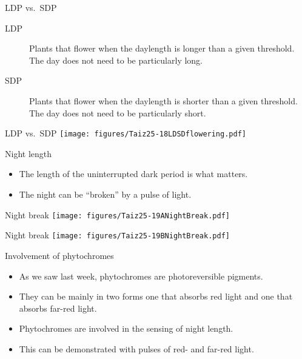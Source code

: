 \documentclass[10pt]{beamer}
\begin{document}
\begin{frame}{LDP vs.\ SDP}
    \begin{description}
        \item[LDP] Plants that flower when the daylength is longer than a given threshold. The day does not need to be particularly long.
        \item[SDP] Plants that flower when the daylength is shorter than a given threshold. The day does not need to be particularly short.
    \end{description}
\end{frame}

\begin{frame}{LDP vs.\ SDP}
    \centering
    \texttt{[image: figures/Taiz25-18LDSDflowering.pdf]}\\
    {\small \autocite[from][]{TaiZei2006}}
\end{frame}

\begin{frame}{Night length}
    \begin{itemize}
        \item The length of the uninterrupted dark period is what matters.
        \item The night can be ``broken'' by a pulse of light.
    \end{itemize}
\end{frame}

\begin{frame}{Night break}
    \centering
    \texttt{[image: figures/Taiz25-19ANightBreak.pdf]}\\
    {\small \autocite[from][]{TaiZei2006}}
\end{frame}

\begin{frame}{Night break}
    \centering
    \texttt{[image: figures/Taiz25-19BNightBreak.pdf]}\\
    {\small \autocite[from][]{TaiZei2006}}
\end{frame}

\begin{frame}{Involvement of phytochromes}
    \begin{itemize}
        \item As we saw last week, phytochromes are photoreversible pigments.
        \item They can be mainly in two forms one that absorbs red light and one that absorbs far-red light.
        \item Phytochromes are involved in the sensing of night length.
        \item This can be demonstrated with pulses of red- and far-red light.
    \end{itemize}
\end{frame}
\end{document}
